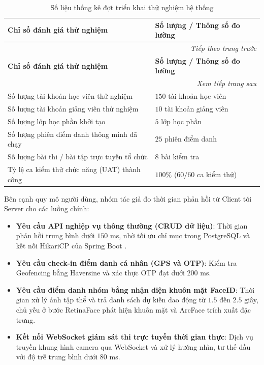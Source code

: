 \documentclass[../DoAn.tex]{subfiles}
\begin{document}
\begin{longtable}{|p{}|p{}|}
    \caption{Số liệu thống kê đợt triển khai thử nghiệm hệ thống}
    \label{table:trial_deployment_statistics}\\
    \hline
    \textbf{Chỉ số đánh giá thử nghiệm} & \textbf{Số lượng / Thông số đo lường} \\ \hline
    \endfirsthead
    \multicolumn{2}{r}{\textit{Tiếp theo trang trước}} \\
    \hline
    \textbf{Chỉ số đánh giá thử nghiệm} & \textbf{Số lượng / Thông số đo lường} \\ \hline
    \endhead
    \hline
    \multicolumn{2}{r}{\textit{Xem tiếp trang sau}} \\
    \endfoot
    \hline
    \endlastfoot
    Số lượng tài khoản học viên thử nghiệm & $150$ tài khoản học viên \\ \hline
    Số lượng tài khoản giảng viên thử nghiệm & $10$ tài khoản giảng viên \\ \hline
    Số lượng lớp học phần khởi tạo & $5$ lớp học phần \\ \hline
    Số lượng phiên điểm danh thông minh đã chạy & $25$ phiên điểm danh \\ \hline
    Số lượng bài thi / bài tập trực tuyến tổ chức & $8$ bài kiểm tra \\ \hline
    Tỷ lệ ca kiểm thử chức năng (UAT) thành công & $100\%$ ($60/60$ ca kiểm thử) \\ \hline
\end{longtable}

Bên cạnh quy mô người dùng, nhóm tác giả đo thời gian phản hồi từ Client tới Server cho các luồng chính:
\begin{itemize}
    \item \textbf{Yêu cầu API nghiệp vụ thông thường (CRUD dữ liệu)}: Thời gian phản hồi trung bình dưới $150$ ms, nhờ tối ưu chỉ mục trong PostgreSQL \cite{postgresql_docs2026} và kết nối HikariCP của Spring Boot \cite{spring_boot_docs2026}.
    \item \textbf{Yêu cầu check-in điểm danh cá nhân (GPS và OTP)}: Kiểm tra Geofencing bằng Haversine \cite{sinnott1984virtues} và xác thực OTP đạt dưới $200$ ms.
    \item \textbf{Yêu cầu điểm danh nhóm bằng nhận diện khuôn mặt FaceID}: Thời gian xử lý ảnh tập thể và trả danh sách dự kiến dao động từ $1.5$ đến $2.5$ giây, chủ yếu ở bước RetinaFace \cite{Deng_2020_CVPR} phát hiện khuôn mặt và ArcFace \cite{Deng_2019_CVPR} trích xuất đặc trưng.
    \item \textbf{Kết nối WebSocket giám sát thi trực tuyến thời gian thực}: Dịch vụ  truyền khung hình camera qua WebSocket và xử lý hướng nhìn, tư thế đầu \cite{Lugaresi2019MediaPipe, Lepetit2009EPnP} với độ trễ trung bình dưới $80$ ms.
\end{itemize}
\end{document}
